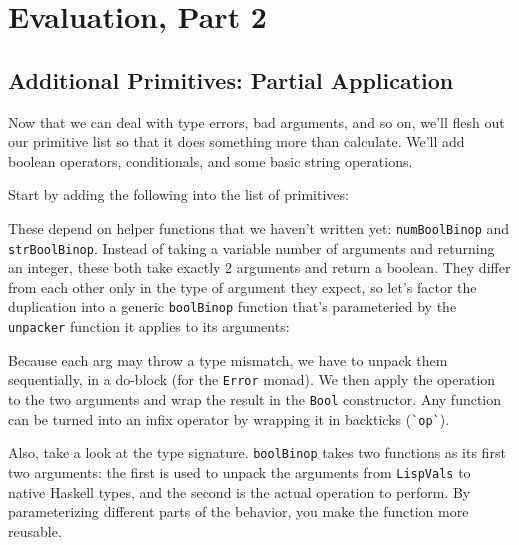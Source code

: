 \chapter{Evaluation, Part 2}
 
 
\section{Additional Primitives: Partial Application}
 
Now that we can deal with type errors, bad arguments, and so on, we'll flesh out our primitive list so that it does something more than calculate. We'll add boolean operators, conditionals, and some basic string operations.
 
Start by adding the following into the list of primitives:
 
 
These depend on helper functions that we haven't written yet: \verb|numBoolBinop| and \verb|strBoolBinop|. Instead of taking a variable number of arguments and returning an integer, these both take exactly 2 arguments and return a boolean. They differ from each other only in the type of argument they expect, so let's factor the duplication into a generic \verb|boolBinop| function that's parameteried by the \verb|unpacker| function it applies to its arguments:
 
 
Because each arg may throw a type mismatch, we have to unpack them sequentially, in a do-block (for the \verb|Error| monad). We then apply the operation to the two arguments and wrap the result in the \verb|Bool| constructor. Any function can be turned into an infix operator by wrapping it in backticks (\lstinline|`op`|).
 
Also, take a look at the type signature. \verb|boolBinop| takes two functions as its first two arguments: the first is used to unpack the arguments from \verb|LispVals| to native Haskell types, and the second is the actual operation to perform. By parameterizing different parts of the behavior, you make the function more reusable.
 
